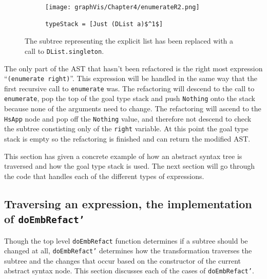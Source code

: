 \begin{figure}[t]
	\begin{subfigure}{\linewidth}
		\texttt{[image: graphVis/Chapter4/enumerateR2.png]}
	\end{subfigure}\par\medskip

	\begin{subfigure}{\linewidth}
		\begin{lstlisting}[mathescape]
			typeStack = [Just (DList a)$^1$]
		\end{lstlisting}
	\end{subfigure}\par\medskip
\caption{The subtree representing the explicit list has been replaced with a call to \texttt{DList.singleton}.}
\label{enumStateR2}
\end{figure}

The only part of the AST that hasn't been refactored is the right most expression ``\texttt{(enumerate right)}''. This expression will be handled in the same way that the first recursive call to \texttt{enumerate} was. The refactoring will descend to the call to \texttt{enumerate}, pop the top of the goal type stack and push \texttt{Nothing} onto the stack because none of the arguments need to change. The refactoring will ascend to the \texttt{HsApp} node and pop off the \texttt{Nothing} value, and therefore not descend to check the subtree constisting only of the \texttt{right} variable. At this point the goal type stack is empty so the refactoring is finished and can return the modified AST.

This section has given a concrete example of how an abstract syntax tree is traversed and how the goal type stack is used. The next section will go through the code that handles each of the different types of expressions.

\subsection{Traversing an expression, the implementation of \texttt{doEmbRefact'}}

Though the top level \texttt{doEmbRefact} function determines if a subtree should be changed at all, \texttt{doEmbRefact'} determines how the transformation traverses the subtree and the changes that occur based on the constructor of the current abstract syntax node. This section discusses each of the cases of \texttt{doEmbRefact'}.

